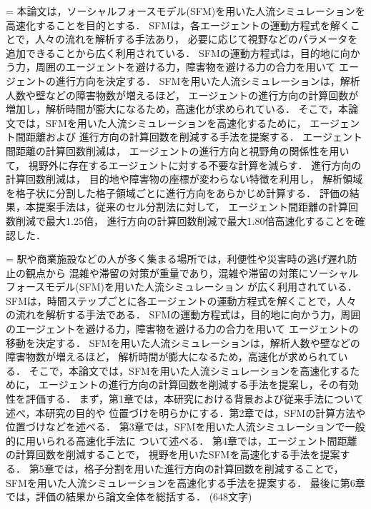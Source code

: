 
={
本論文は，ソーシャルフォースモデル(SFM)を用いた人流シミュレーションを高速化することを目的とする．
SFMは，各エージェントの運動方程式を解くことで，人々の流れを解析する手法あり，
必要に応じて視野などのパラメータを追加できることから広く利用されている．
SFMの運動方程式は，目的地に向かう力，周囲のエージェントを避ける力，障害物を避ける力の合力を用いて
エージェントの進行方向を決定する．
SFMを用いた人流シミュレーションは，解析人数や壁などの障害物数が増えるほど，
エージェントの進行方向の計算回数が増加し，解析時間が膨大になるため，高速化が求められている．
そこで，本論文では，SFMを用いた人流シミュレーションを高速化するために，
エージェント間距離および
進行方向の計算回数を削減する手法を提案する．
エージェント間距離の計算回数削減は，
エージェントの進行方向と視野角の関係性を用いて，
視野外に存在するエージェントに対する不要な計算を減らす．
進行方向の計算回数削減は，
目的地や障害物の座標が変わらない特徴を利用し，
解析領域を格子状に分割した格子領域ごとに進行方向をあらかじめ計算する．
評価の結果，本提案手法は，従来のセル分割法に対して，
エージェント間距離の計算回数削減で最大1.25倍，
進行方向の計算回数削減で最大1.80倍高速化することを確認した．
}

={
駅や商業施設などの人が多く集まる場所では，利便性や災害時の逃げ遅れ防止の観点から
混雑や滞留の対策が重量であり，混雑や滞留の対策にソーシャルフォースモデル(SFM)を用いた人流シミュレーション
が広く利用されている．
SFMは，時間ステップごとに各エージェントの運動方程式を解くことで，人々の流れを解析する手法である．
SFMの運動方程式は，目的地に向かう力，周囲のエージェントを避ける力，障害物を避ける力の合力を用いて
エージェントの移動を決定する．
SFMを用いた人流シミュレーションは，解析人数や壁などの障害物数が増えるほど，
解析時間が膨大になるため，高速化が求められている．
そこで，本論文では，SFMを用いた人流シミュレーションを高速化するために，
エージェントの進行方向の計算回数を削減する手法を提案し，その有効性を評価する．
まず，第1章では，本研究における背景および従来手法について述べ，本研究の目的や
位置づけを明らかにする．第2章では，SFMの計算方法や位置づけなどを述べる．
第3章では，SFMを用いた人流シミュレーションで一般的に用いられる高速化手法に
ついて述べる．
第4章では，エージェント間距離の計算回数を削減することで，
視野を用いたSFMを高速化する手法を提案する．
第5章では，格子分割を用いた進行方向の計算回数を削減することで，
SFMを用いた人流シミュレーションを高速化する手法を提案する．
最後に第6章では，評価の結果から論文全体を総括する．
(648文字)
}

